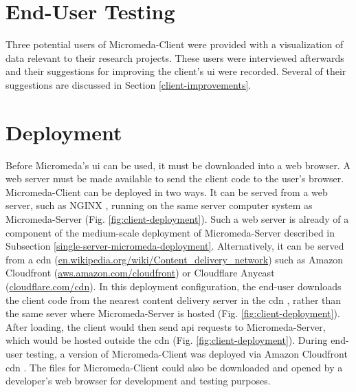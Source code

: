 \section{End-User Testing}

Three potential users of Micromeda-Client were provided with a visualization of 
data relevant to their research projects. These users were interviewed 
afterwards and their suggestions for improving the client's \gls{ui} were 
recorded. Several of their suggestions are discussed in Section 
\ref{client-improvements}. 

\section{Deployment}

Before Micromeda's \gls{ui} can be used, it must be downloaded into a web 
browser. A web server must be made available to send the client code to the 
user's browser. Micromeda-Client can be deployed in two ways. It can be served 
from a web server, such as NGINX \cite{reese2008nginx}, running on the same 
server computer system as Micromeda-Server (Fig. \ref{fig:client-deployment}). 
Such a web server is already of a component of the medium-scale deployment of 
Micromeda-Server described in Subsection 
\ref{single-server-micromeda-deployment}. Alternatively, it can be served from a 
\gls{cdn} \cite{farber2003internet} 
(\href{http://en.wikipedia.org/wiki/Content_delivery_network}{en.wikipedia.org/wiki/Content\_delivery\_network}) 
such as Amazon Cloudfront \cite{varia2014overview} 
(\href{http://aws.amazon.com/cloudfront}{aws.amazon.com/cloudfront}) or 
Cloudflare Anycast \cite{calder2015analyzing} 
(\href{http://cloudflare.com/cdn}{cloudflare.com/cdn}). In this deployment 
configuration, the end-user downloads the client code from the nearest content 
delivery server in the \gls{cdn} , rather than the same sever where 
Micromeda-Server is hosted (Fig. \ref{fig:client-deployment}). After loading, 
the client would then send \gls{api} requests to Micromeda-Server, which would 
be hosted outside the \gls{cdn}  (Fig. \ref{fig:client-deployment}). During 
end-user testing, a version of Micromeda-Client was deployed via Amazon 
Cloudfront \gls{cdn} . The files for Micromeda-Client could also be downloaded 
and opened by a developer's web browser for development and testing purposes.

